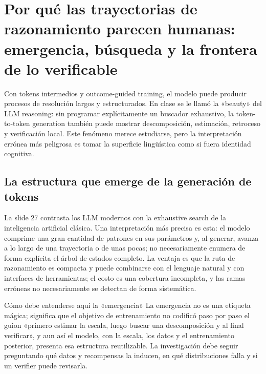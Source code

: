 \section{Por qué las trayectorias de razonamiento parecen humanas: emergencia, búsqueda y la frontera de lo verificable}

Con tokens intermedios y outcome-guided training, el modelo puede producir procesos de resolución largos y estructurados. En clase se le llamó la «beauty» del LLM reasoning: sin programar explícitamente un buscador exhaustivo, la token-to-token generation también puede mostrar descomposición, estimación, retroceso y verificación local. Este fenómeno merece estudiarse, pero la interpretación errónea más peligrosa es tomar la superficie lingüística como si fuera identidad cognitiva.

\subsection{La estructura que emerge de la generación de tokens}

La slide 27 contrasta los LLM modernos con la exhaustive search de la inteligencia artificial clásica. Una interpretación más precisa es esta: el modelo comprime una gran cantidad de patrones en sus parámetros y, al generar, avanza a lo largo de una trayectoria o de unas pocas; no necesariamente enumera de forma explícita el árbol de estados completo. La ventaja es que la ruta de razonamiento es compacta y puede combinarse con el lenguaje natural y con interfaces de herramientas; el costo es una cobertura incompleta, y las ramas erróneas no necesariamente se detectan de forma sistemática.



\begin{importantbox}{Cómo debe entenderse aquí la «emergencia»}
La emergencia no es una etiqueta mágica; significa que el objetivo de entrenamiento no codificó paso por paso el guion «primero estimar la escala, luego buscar una descomposición y al final verificar», y aun así el modelo, con la escala, los datos y el entrenamiento posterior, presenta esa estructura reutilizable. La investigación debe seguir preguntando qué datos y recompensas la inducen, en qué distribuciones falla y si un verifier puede revisarla.
\end{importantbox}


